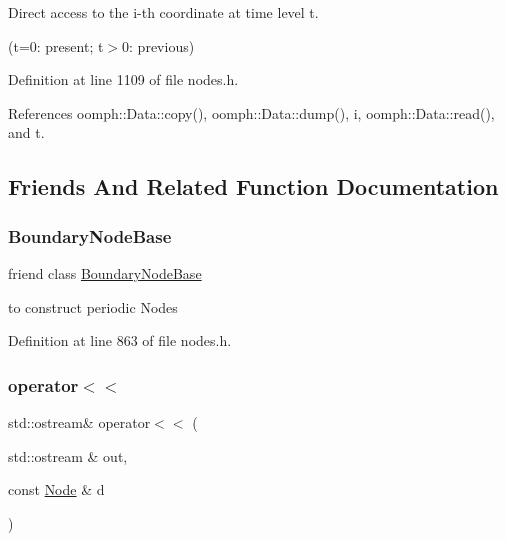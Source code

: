 Direct access to the i-\/th coordinate at time level t. 

(t=0\+: present; t$>$0\+: previous) 

Definition at line 1109 of file nodes.\+h.



References oomph\+::\+Data\+::copy(), oomph\+::\+Data\+::dump(), i, oomph\+::\+Data\+::read(), and t.



\subsection{Friends And Related Function Documentation}
\mbox{\label{classoomph_1_1Node_a3d5c6d911301ca1704ce34955d8b3c6b}} 
\subsubsection{\texorpdfstring{Boundary\+Node\+Base}{BoundaryNodeBase}}
{\footnotesize\ttfamily friend class \hyperlink{classoomph_1_1BoundaryNodeBase}{Boundary\+Node\+Base}\hspace{0.3cm}{\ttfamily [friend]}}



to construct periodic Nodes 



Definition at line 863 of file nodes.\+h.

\mbox{\label{classoomph_1_1Node_acdfb367cd4c2661ea1edf78baa40014c}} 
\subsubsection{\texorpdfstring{operator$<$$<$}{operator<<}}
{\footnotesize\ttfamily std\+::ostream\& operator$<$$<$ (\begin{DoxyParamCaption}\item[{std\+::ostream \&}]{out,  }\item[{const \hyperlink{classoomph_1_1Node}{Node} \&}]{d }\end{DoxyParamCaption})\hspace{0.3cm}{\ttfamily [friend]}}

